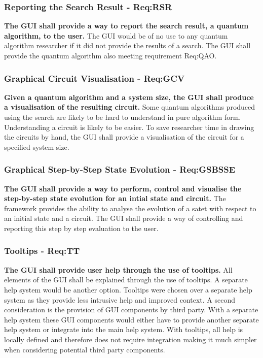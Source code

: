 \subsubsection{Reporting the Search Result - Req:RSR}
\label{sec:reqrsr}
\textbf{The GUI shall provide a way to report the search result, a quantum algorithm, to the user.}
The GUI would be of no use to any quantum algorithm researcher if it did not provide the results of a search.
The GUI shall provide the quantum algorithm also meeting requirement Req:QAO.

\subsubsection{Graphical Circuit Visualisation - Req:GCV}
\label{sec:reqgcv}
\textbf{Given a quantum algorithm and a system size, the GUI shall produce a visualisation of the resulting circuit.}
Some quantum algorithms produced using the search are likely to be hard to understand in pure algorithm form.
Understanding a circuit is likely to be easier.
To save researcher time in drawing the circuits by hand, the GUI shall provide a visualisation of the circuit for a specified system size.

\subsubsection{Graphical Step-by-Step State Evolution - Req:GSBSSE}
\label{sec:reqgsbsse}
\textbf{The GUI shall provide a way to perform, control and visualise the step-by-step state evolution for an intial state and circuit.}
The framework provides the ability to analyse the evolution of a satet with respect to an initial state and a circuit.
The GUI shall provide a way of controlling and reporting this step by step evaluation to the user.

\subsubsection{Tooltips - Req:TT}
\label{sec:reqtt}
\textbf{The GUI shall provide user help through the use of tooltips.}
All elements of the GUI shall be explained through the use of tooltips.
A separate help system would be another option.
Tooltips were chosen over a separate help system as they provide less intrusive help and improved context.
A second consideration is the provision of GUI components by third party.
With a separate help system these GUI components would either have to provide another separate help system or integrate into the main help system.
With tooltips, all help is locally defined and therefore does not require integration making it much simpler when considering potential third party components.

